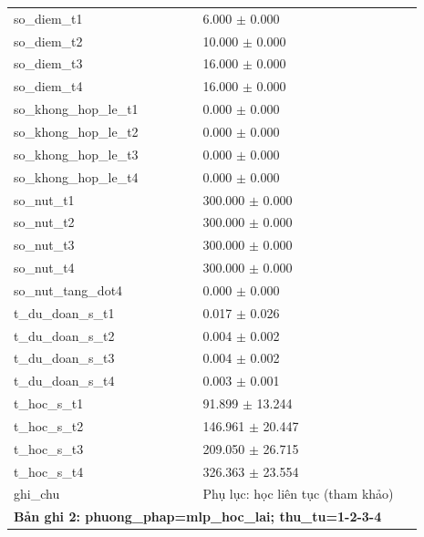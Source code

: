 \begin{longtable}{p{0.43\linewidth}p{0.50\linewidth}}
so\_\allowbreak diem\_\allowbreak t1 & 6.000 $\pm$ 0.000 \\
so\_\allowbreak diem\_\allowbreak t2 & 10.000 $\pm$ 0.000 \\
so\_\allowbreak diem\_\allowbreak t3 & 16.000 $\pm$ 0.000 \\
so\_\allowbreak diem\_\allowbreak t4 & 16.000 $\pm$ 0.000 \\
so\_\allowbreak khong\_\allowbreak hop\_\allowbreak le\_\allowbreak t1 & 0.000 $\pm$ 0.000 \\
so\_\allowbreak khong\_\allowbreak hop\_\allowbreak le\_\allowbreak t2 & 0.000 $\pm$ 0.000 \\
so\_\allowbreak khong\_\allowbreak hop\_\allowbreak le\_\allowbreak t3 & 0.000 $\pm$ 0.000 \\
so\_\allowbreak khong\_\allowbreak hop\_\allowbreak le\_\allowbreak t4 & 0.000 $\pm$ 0.000 \\
so\_\allowbreak nut\_\allowbreak t1 & 300.000 $\pm$ 0.000 \\
so\_\allowbreak nut\_\allowbreak t2 & 300.000 $\pm$ 0.000 \\
so\_\allowbreak nut\_\allowbreak t3 & 300.000 $\pm$ 0.000 \\
so\_\allowbreak nut\_\allowbreak t4 & 300.000 $\pm$ 0.000 \\
so\_\allowbreak nut\_\allowbreak tang\_\allowbreak dot4 & 0.000 $\pm$ 0.000 \\
t\_\allowbreak du\_\allowbreak doan\_\allowbreak s\_\allowbreak t1 & 0.017 $\pm$ 0.026 \\
t\_\allowbreak du\_\allowbreak doan\_\allowbreak s\_\allowbreak t2 & 0.004 $\pm$ 0.002 \\
t\_\allowbreak du\_\allowbreak doan\_\allowbreak s\_\allowbreak t3 & 0.004 $\pm$ 0.002 \\
t\_\allowbreak du\_\allowbreak doan\_\allowbreak s\_\allowbreak t4 & 0.003 $\pm$ 0.001 \\
t\_\allowbreak hoc\_\allowbreak s\_\allowbreak t1 & 91.899 $\pm$ 13.244 \\
t\_\allowbreak hoc\_\allowbreak s\_\allowbreak t2 & 146.961 $\pm$ 20.447 \\
t\_\allowbreak hoc\_\allowbreak s\_\allowbreak t3 & 209.050 $\pm$ 26.715 \\
t\_\allowbreak hoc\_\allowbreak s\_\allowbreak t4 & 326.363 $\pm$ 23.554 \\
ghi\_\allowbreak chu & Phụ lục: học liên tục (tham khảo) \\
\midrule
\multicolumn{2}{p{0.95\linewidth}}{\textbf{Bản ghi 2: phuong\_phap=mlp\_hoc\_lai; thu\_tu=1-2-3-4}} \\

\end{longtable}
